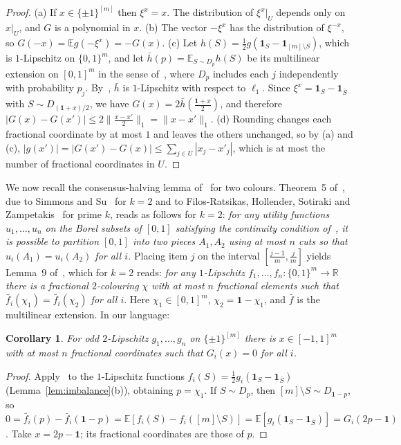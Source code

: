\documentclass[11pt,letterpaper]{article}
\newtheorem{corollary}[theorem]{Corollary}
\theoremstyle{definition}
\newcommand{\R}{\mathbb{R}}
\newcommand{\E}{\mathbb{E}}
\newcommand{\cube}[1]{\{\pm1\}^{#1}}
\begin{document}
\begin{proof}
(a) If $x\in\cube{[m]}$ then $\xi^x=x$. The distribution of $\xi^x|_U$ depends only on $x|_U$, and
$G$ is a polynomial in $x$. (b) The vector $-\xi^x$ has the distribution of $\xi^{-x}$, so
$G(-x)=\E g(-\xi^x)=-G(x)$. (c) Let $h(S)=\frac12g(\mathbf 1_S-\mathbf 1_{[m]\setminus S})$, which
is $1$-Lipschitz on $\{0,1\}^m$, and let $\bar h(p)=\E_{S\sim D_p}h(S)$ be its multilinear
extension on $[0,1]^m$ in the sense of~\cite{HMMS25}, where $D_p$ includes each $j$ independently
with probability $p_j$. By~\cite[Lemma~16]{HMMS25}, $\bar h$ is $1$-Lipschitz with respect to
$\ell_1$. Since $\xi^x=\mathbf 1_S-\mathbf 1_{\bar S}$ with $S\sim D_{(\mathbf 1+x)/2}$, we have
$G(x)=2\bar h(\frac{\mathbf 1+x}2)$, and therefore
$|G(x)-G(x')|\le2\|\frac{x-x'}2\|_1=\|x-x'\|_1$. (d) Rounding changes each fractional coordinate by
at most $1$ and leaves the others unchanged, so by (a) and (c),
$|g(x')|=|G(x')-G(x)|\le\sum_{j\in U}|x_j-x'_j|$, which is at most the number of fractional
coordinates in $U$.
\end{proof}

We now recall the consensus-halving lemma of~\cite{HMMS25} for two colours. Theorem~5
of~\cite{HMMS25}, due to Simmons and Su~\cite{SS03} for $k=2$ and to Filos-Ratsikas, Hollender,
Sotiraki and Zampetakis~\cite{FHSZ21} for prime $k$, reads as follows for $k=2$: \emph{for any
utility functions $u_1,\dots,u_n$ on the Borel subsets of $[0,1]$ satisfying the continuity
condition of~\cite[Assumption~4]{HMMS25}, it is possible to partition $[0,1]$ into two pieces
$A_1,A_2$ using at most $n$ cuts so that $u_i(A_1)=u_i(A_2)$ for all $i$.} Placing item $j$ on the
interval $[\frac{j-1}m,\frac jm]$ yields Lemma~9 of~\cite{HMMS25}, which for $k=2$ reads:
\emph{for any $1$-Lipschitz $f_1,\dots,f_n\colon\{0,1\}^m\to\R$ there is a fractional
$2$-colouring $\chi$ with at most $n$ fractional elements such that
$\bar f_i(\chi_1)=\bar f_i(\chi_2)$ for all $i$}. Here $\chi_1\in[0,1]^m$, $\chi_2=\mathbf
1-\chi_1$, and $\bar f$ is the multilinear extension. In our language:

\begin{corollary}\label{cor:lemma9}
For odd $2$-Lipschitz $g_1,\dots,g_n$ on $\cube{[m]}$ there is $x\in[-1,1]^m$ with at most $n$
fractional coordinates such that $G_i(x)=0$ for all $i$.
\end{corollary}

\begin{proof}
Apply~\cite[Lemma~9]{HMMS25} to the $1$-Lipschitz functions
$f_i(S)=\frac12g_i(\mathbf 1_S-\mathbf 1_{\bar S})$ (Lemma~\ref{lem:imbalance}(b)), obtaining
$p=\chi_1$. If $S\sim D_p$, then $[m]\setminus S\sim D_{\mathbf 1-p}$, so
$0=\bar f_i(p)-\bar f_i(\mathbf 1-p)=\E[f_i(S)-f_i([m]\setminus S)]=\E[g_i(\mathbf 1_S-\mathbf
1_{\bar S})]=G_i(2p-\mathbf 1)$. Take $x=2p-\mathbf 1$; its fractional coordinates are those of
$p$.
\end{proof}
\end{document}
